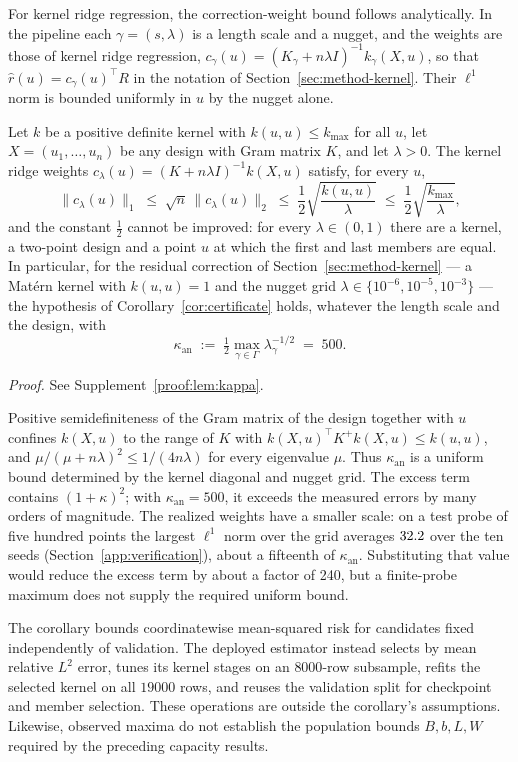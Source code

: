 For kernel ridge regression, the correction-weight bound follows analytically. In
the pipeline each $\gamma=(s,\lambda)$ is a length scale and a nugget, and
the weights are those of kernel ridge regression,
$c_\gamma(u)=(K_\gamma+n\lambda I)^{-1}k_\gamma(X,u)$, so that
$\widehat r(u)=c_\gamma(u)^\top R$ in the notation of
Section~\ref{sec:method-kernel}. Their $\ell^1$ norm is bounded uniformly in
$u$ by the nugget alone.

\begin{lemma}\label{lem:kappa}
Let $k$ be a positive definite kernel with $k(u,u)\le k_{\max}$ for all $u$,
let $X=(u_1,\dots,u_n)$ be any design with Gram matrix $K$, and let
$\lambda>0$. The kernel ridge weights
$c_\lambda(u)=(K+n\lambda I)^{-1}k(X,u)$ satisfy, for every $u$,
\[
\|c_\lambda(u)\|_1\;\le\;\sqrt n\,\|c_\lambda(u)\|_2\;\le\;
\frac12\sqrt{\frac{k(u,u)}{\lambda}}\;\le\;\frac12\sqrt{\frac{k_{\max}}{\lambda}} ,
\]
and the constant $\tfrac12$ cannot be improved: for every $\lambda\in(0,1)$
there are a kernel, a two-point design and a point $u$ at which the first
and last members are equal. In particular, for the residual correction of
Section~\ref{sec:method-kernel} --- a Mat\'ern kernel with $k(u,u)=1$ and
the nugget grid $\lambda\in\{10^{-6},10^{-5},10^{-3}\}$ --- the hypothesis
of Corollary~\ref{cor:certificate} holds, whatever the length scale and the
design, with
\[
\kappa_{\mathrm{an}}\;:=\;\tfrac12\max_{\gamma\in\Gamma}\lambda_\gamma^{-1/2}\;=\;500.
\]
\end{lemma}
\noindent\emph{Proof.} See Supplement~\ref{proof:lem:kappa}.


Positive semidefiniteness of the Gram matrix of the design together with
$u$ confines
$k(X,u)$ to the range of $K$ with $k(X,u)^\top K^{+}k(X,u)\le k(u,u)$, and
$\mu/(\mu+n\lambda)^2\le1/(4n\lambda)$ for every eigenvalue $\mu$.
Thus $\kappa_{\mathrm{an}}$ is a uniform bound determined by the kernel
diagonal and nugget grid. The excess term contains $(1+\kappa)^2$;
with $\kappa_{\mathrm{an}}=500$, it exceeds the measured errors by many
orders of magnitude. The realized weights have a smaller scale:
on a test probe of five hundred points the largest $\ell^1$ norm over the
grid averages $32.2$ over the ten seeds
(Section~\ref{app:verification}), about a fifteenth of
$\kappa_{\mathrm{an}}$. Substituting that value would reduce the excess term
by about a factor of 240, but a finite-probe maximum does not supply the
required uniform bound.

The corollary bounds coordinatewise mean-squared risk for candidates fixed
independently of validation. The deployed estimator instead selects by
mean relative $L^2$ error, tunes its kernel stages on an $8000$-row
subsample, refits the selected kernel on all $19000$ rows, and reuses the
validation split for checkpoint and member selection. These operations are
outside the corollary's assumptions. Likewise, observed maxima do not
establish the population bounds $B,b,L,W$ required by the preceding
capacity results.

